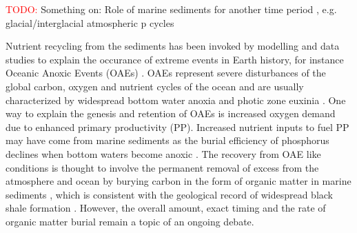 \documentclass[gmd, manuscript]{copernicus}
\begin{document}

\textcolor{red}{TODO:} Something on: Role of marine sediments for another time period , e.g. glacial/interglacial atmospheric p cycles

Nutrient recycling from the sediments has been invoked by modelling and data studies to explain the occurance of extreme events in Earth history, for instance Oceanic Anoxic Events (OAEs) 
\citep[e.g.][]{mort_phosphorus_2007, tsandev_modeling_2009}. OAEs represent severe disturbances of the global carbon, oxygen and nutrient cycles of the ocean and are usually characterized 
by widespread bottom water anoxia and photic zone euxinia \citep{jenkyns_geochemistry_2010}. 
One way to explain the genesis and retention of OAEs is increased oxygen demand due to enhanced primary productivity (PP). Increased nutrient inputs to fuel PP may have come from marine sediments as the 
burial efficiency of phosphorus declines when bottom waters become anoxic \citep{ingall_evidence_1994, van_cappellen_benthic_1994}. 
The recovery from OAE like conditions is thought to involve the permanent removal of excess  from the atmosphere and ocean by burying carbon in the form of organic matter in marine sediments 
\citep[e.g.][]{arthur_geochemical_1988, jarvis_black_2011}, which is consistent with the geological record of widespread black shale formation \citep{stein_accumulation_1986}. 
However, the overall amount, exact timing and the rate of organic matter burial remain a topic of an ongoing debate. 

\end{document}
